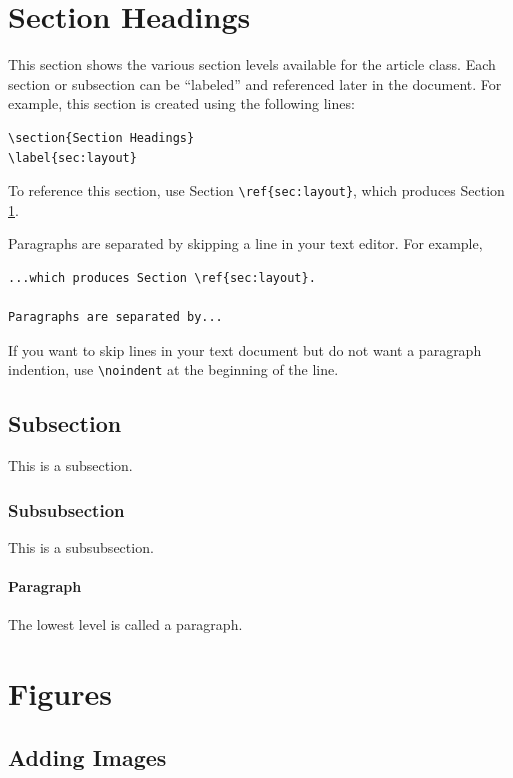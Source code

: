 \documentclass[12pt,letterpaper]{article}
\begin{document}
\section{Section Headings}
\label{sec:layout}
This section shows the various section levels available for the article class.  Each section or subsection can be ``labeled'' and referenced later in the document.  For example, this section is created using the following lines:
\begin{verbatim}
\section{Section Headings}
\label{sec:layout}
\end{verbatim}
To reference this section, use Section \verb=\ref{sec:layout}=, which produces Section \ref{sec:layout}.

Paragraphs are separated by skipping a line in your text editor.  For example,
\begin{verbatim}
...which produces Section \ref{sec:layout}.

Paragraphs are separated by...
\end{verbatim}

If you want to skip lines in your text document but do not want a paragraph indention, use \verb=\noindent= at the beginning of the line.

\subsection{Subsection}

This is a subsection.

\subsubsection{Subsubsection}

This is a subsubsection.

\paragraph{Paragraph}

The lowest level is called a paragraph.

\section{Figures}

\subsection{Adding Images}
\end{document}

